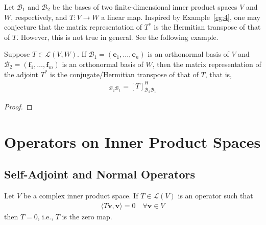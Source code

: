 \documentclass[thmcnt=section, color=blue, 12pt]{my-elegantbook}
\begin{document}

Let $\mathcal{B}_1$ and $\mathcal{B}_2$ be the bases 
of two finite-dimensional inner product spaces $V$ and $W$,
respectively, and $T: V \to W$ a linear map.
Inspired by Example~\ref{eg:4}, one may conjecture that
the matrix representation of $T^\ast$ is the Hermitian transpose
of that of $T$.
However, this is not true in general.
See the following example.

\begin{example} \label{eg:5}
\end{example}

\begin{theorem} \label{thm:16}
	Suppose $T \in \mathcal{L}(V, W)$.
	If $\mathcal{B}_1 = (\mathbf{e}_1, \ldots, \mathbf{e}_n)$
	is an orthonormal basis of $V$
	and $\mathcal{B}_2 = (\mathbf{f}_1, \ldots, \mathbf{f}_m)$
	is an orthonormal basis of $W$,
	then the matrix representation of the adjoint $T^\ast$
	is the conjugate/Hermitian transpose of that of $T$, that is,
	\begin{align*}
		[T^\ast]_{\mathcal{B}_2 \mathcal{B}_1} = 
		[T]^{H}_{\mathcal{B}_2 \mathcal{B}_1}
	\end{align*}
\end{theorem}

\begin{proof}
\end{proof}


\chapter{Operators on Inner Product Spaces}


\section{Self-Adjoint and Normal Operators}


\begin{proposition} \label{pro:8}
	Let $V$ be a complex inner product space.
	If $T \in \mathcal{L}(V)$ is an operator such that 
	\begin{align}
		\langle T \mathbf{v}, \mathbf{v} \rangle = 0
		\quad \forall \mathbf{v} \in V
		\label{eq:46}
	\end{align}
	then $T = 0$, i.e., $T$ is the zero map.
\end{proposition}
\end{document}
